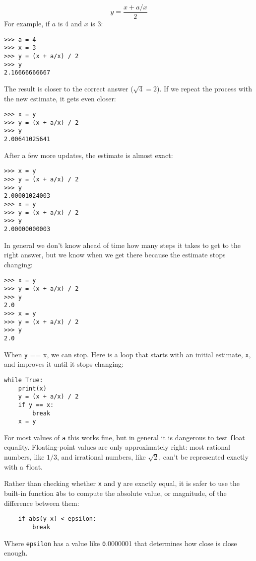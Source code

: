 \documentclass[
DIV=11,
fontsize=12,
twoside,
headinclude=false,
titlepage=firstiscover,
abstract=true,
headsepline=true,
footsepline=true,
chapterprefix=true, %
headings=big,
bibliography=totoc,%
captions=tableheading
]{scrbook}
\theoremstyle{definition}
\begin{document}
\[ y = \frac{x + a/x}{2} \]
%
For example, if $a$ is 4 and $x$ is 3:

\begin{lstlisting}
>>> a = 4
>>> x = 3
>>> y = (x + a/x) / 2
>>> y
2.16666666667
\end{lstlisting}
%
The result is closer to the correct answer ($\sqrt{4} = 2$).  If we
repeat the process with the new estimate, it gets even closer:

\begin{lstlisting}
>>> x = y
>>> y = (x + a/x) / 2
>>> y
2.00641025641
\end{lstlisting}
%
After a few more updates, the estimate is almost exact:

\begin{lstlisting}
>>> x = y
>>> y = (x + a/x) / 2
>>> y
2.00001024003
>>> x = y
>>> y = (x + a/x) / 2
>>> y
2.00000000003
\end{lstlisting}
%
In general we don't know ahead of time how many steps it takes
to get to the right answer, but we know when we get there
because the estimate
stops changing:

\begin{lstlisting}
>>> x = y
>>> y = (x + a/x) / 2
>>> y
2.0
>>> x = y
>>> y = (x + a/x) / 2
>>> y
2.0
\end{lstlisting}
%
When {\texttt y == x}, we can stop.  Here is a loop that starts
with an initial estimate, {\texttt x}, and improves it until it
stops changing:

\begin{lstlisting}
while True:
    print(x)
    y = (x + a/x) / 2
    if y == x:
        break
    x = y
\end{lstlisting}
%
For most values of {\texttt a} this works fine, but in general it is
dangerous to test {\texttt float} equality.
Floating-point values are only approximately right:
most rational numbers, like $1/3$, and irrational numbers, like
$\sqrt{2}$, can't be represented exactly with a {\texttt float}.

Rather than checking whether {\texttt x} and {\texttt y} are exactly equal, it
is safer to use the built-in function {\texttt abs} to compute the
absolute value, or magnitude, of the difference between them:

\begin{lstlisting}
    if abs(y-x) < epsilon:
        break
\end{lstlisting}
%
Where \verb"epsilon" has a value like {\texttt 0.0000001} that
determines how close is close enough.
\end{document}
